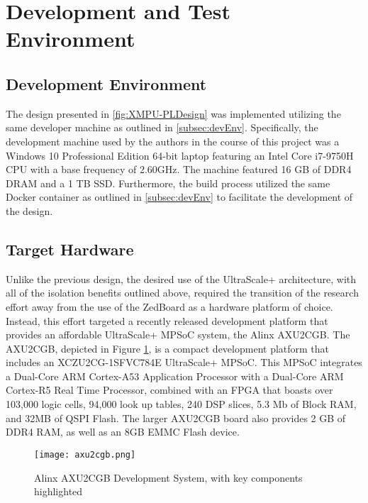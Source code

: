 \section{Development and Test Environment}\label{sec:DMAEnvironment}

\subsection{Development Environment}\label{subsec:DMAEnvironmentDev}
The design presented in \ref{fig:XMPU-PLDesign} was implemented utilizing the same developer machine as outlined in \ref{subsec:devEnv}. Specifically, the development machine used by the authors in the course of this project was a Windows 10 Professional Edition 64-bit laptop featuring an Intel Core i7-9750H CPU with a base frequency of 2.60GHz. The machine featured 16 GB of DDR4 DRAM and a 1 TB SSD. Furthermore, the build process utilized the same Docker container as outlined in \ref{subsec:devEnv} to facilitate the development of the design.

\subsection{Target Hardware}\label{subsec:DMAEnvironmentHW}
Unlike the previous design, the desired use of the UltraScale+ architecture, with all of the isolation benefits outlined above, required the transition of the research effort away from the use of the ZedBoard as a hardware platform of choice. Instead, this effort targeted a recently released development platform that provides an affordable UltraScale+ MPSoC system, the Alinx AXU2CGB. The AXU2CGB, depicted in Figure \ref{fig:AXU2CGB}, is a compact development platform that includes an XCZU2CG-1SFVC784E UltraScale+ MPSoC. This MPSoC integrates a Dual-Core ARM Cortex-A53 Application Processor with a Dual-Core ARM Cortex-R5 Real Time Processor, combined with an FPGA that boasts over 103,000 logic cells, 94,000 look up tables, 240 DSP slices, 5.3 Mb of Block RAM, and 32MB of QSPI Flash. The larger AXU2CGB board also provides 2 GB of DDR4 RAM, as well as an 8GB EMMC Flash device.

\begin{figure}
    \centering
    \texttt{[image: axu2cgb.png]}
    \caption[AXU2CGB Development System]{Alinx AXU2CGB Development System, with key components highlighted \cite{noauthor_axu2cgb_nodate}}
    \label{fig:AXU2CGB}
\end{figure}

